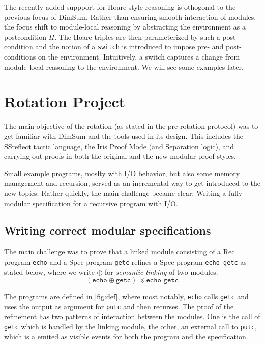 \documentclass[runningheads, orivec]{llncs}
\begin{document}
The recently added suppport for Hoare-style reasoning is othogonal to the previous focus of DimSum. Rather than ensuring smooth interaction of modules, the focus shift to module-local reasoning by abstracting the environment as a postcondition $\Pi$. The Hoare-triples are then parameterized by such a post-condition and the notion of a \texttt{switch} is introduced to impose pre- and post-conditions on the environment. Intuitively, a switch captures a change from module local reasoning to the environment. We will see some examples later.

\section{Rotation Project}\label{sec:proj}

The main objective of the rotation (as stated in the pre-rotation protocol) was to get familiar with DimSum and the tools used in its design. This includes the SSreflect tactic language, the Iris Proof Mode (and Separation logic), and carrying out proofs in both the original and the new modular proof styles.

Small example programs, moslty with I/O behavior, but also some memory management and recursion, served as an incremental way to get introduced to the new topics. Rather quickly, the main challenge became clear: Writing a fully modular specification for a recursive program with I/O.

\subsection{Writing correct modular specifications}

The main challenge was to prove that a linked module consisting of a Rec program \texttt{echo} and a Spec program \texttt{getc} refines a Spec program \texttt{echo\_getc} as stated below, where we write $\oplus$ for \emph{semantic linking} of two modules.
\[(\texttt{echo} \oplus \texttt{getc}) \preceq \texttt{echo\_getc}\]

The programs are defined in \cref{fig:def}, where most notably, \texttt{echo} calls \texttt{getc} and uses the output as argument for \texttt{putc} and then recurses. The proof of the refinement has two patterns of interaction between the modules. One is the call of \texttt{getc} which is handled by the linking module, the other, an external call to \texttt{putc}, which is a emited as visible events for both the program and the specification.
\end{document}
